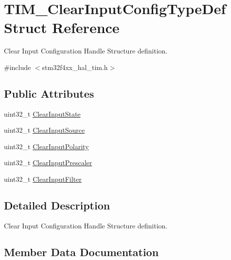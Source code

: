 \hypertarget{struct_t_i_m___clear_input_config_type_def}{}\section{T\+I\+M\+\_\+\+Clear\+Input\+Config\+Type\+Def Struct Reference}
\label{struct_t_i_m___clear_input_config_type_def}


Clear Input Configuration Handle Structure definition.  




{\ttfamily \#include $<$stm32f4xx\+\_\+hal\+\_\+tim.\+h$>$}

\subsection*{Public Attributes}
\begin{DoxyCompactItemize}
\item 
uint32\+\_\+t \hyperlink{struct_t_i_m___clear_input_config_type_def_a01d4b91dd297c4f0582a4d9179abf32f}{Clear\+Input\+State}
\item 
uint32\+\_\+t \hyperlink{struct_t_i_m___clear_input_config_type_def_a776d2f14021a82e022468fd46594b8a0}{Clear\+Input\+Source}
\item 
uint32\+\_\+t \hyperlink{struct_t_i_m___clear_input_config_type_def_a49dbc65edc5316822fcabd61cc8409de}{Clear\+Input\+Polarity}
\item 
uint32\+\_\+t \hyperlink{struct_t_i_m___clear_input_config_type_def_a509cecb64fec71391ddc8b4703e09cfe}{Clear\+Input\+Prescaler}
\item 
uint32\+\_\+t \hyperlink{struct_t_i_m___clear_input_config_type_def_a6d2e06a970e30aaf4f8a6091e443eecf}{Clear\+Input\+Filter}
\end{DoxyCompactItemize}


\subsection{Detailed Description}
Clear Input Configuration Handle Structure definition. 

\subsection{Member Data Documentation}
